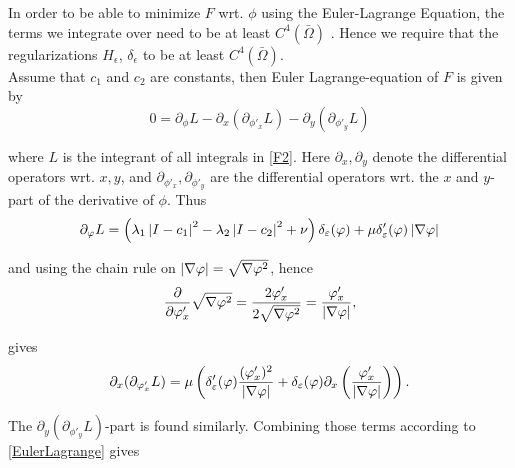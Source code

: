In order to be able to minimize $F$ wrt. $\phi$ using the Euler-Lagrange Equation, the terms we integrate over need to be at least $C^4(\bar{\Omega})$ \cite{fox.50}. Hence we require that the regularizations $H_\epsilon$, $\delta_\epsilon$ to be at least $C^4(\bar{\Omega})$.\\
Assume that $c_1$ and $c_2$ are constants, then Euler Lagrange-equation of $F$ is given by
\begin{equation}\label{EulerLagrange}
  0 = \partial_\phi L - \partial_x (\partial_{\phi'_x}L)-\partial_y(\partial_{\phi'_y} L)
\end{equation}

where $L$ is the integrant of all integrals in \eqref{F2}. Here $\partial_x,\partial_y$ denote the differential operators wrt. $x,y$, and $\partial_{\phi'_x}, \partial_{\phi'_y}$ are the differential operators wrt. the $x$ and $y$-part of the derivative of $\phi$. Thus
\begin{equation}
  \partial_\varphi L = \left(\lambda_1\left| {I-c_1} \right|^2 - \lambda_2\left| {I-c_2} \right|^2 + \nu \right)\delta_\varepsilon(\varphi) + \mu\delta_\varepsilon'(\varphi)\left| {\nabla\varphi} \right|
\end{equation}

and using the chain rule on $\left| {\nabla\varphi} \right| = \sqrt{\nabla\varphi^2}$, hence 
\begin{equation}
  \frac{\partial}{\partial \varphi_x'}\sqrt{\nabla\varphi^2}=\frac{2\varphi_x'}{2\sqrt{\nabla\varphi^2}}=\frac{\varphi_x'}{\left| {\nabla\varphi} \right|},
\end{equation}

gives
\begin{equation}
  \partial_x (\partial_{\varphi'_x}L) = \mu \left(\delta_\varepsilon'(\varphi)\frac{(\varphi_x')^2}{\left| {\nabla \varphi} \right|} + \delta_\varepsilon(\varphi)\partial_x\left(\frac{\varphi_x'}{\left| {\nabla\varphi} \right|}\right)\right).
\end{equation}

The $\partial_y (\partial_{\phi'_y}L)$-part is found similarly. Combining those terms according to \eqref{EulerLagrange} gives

